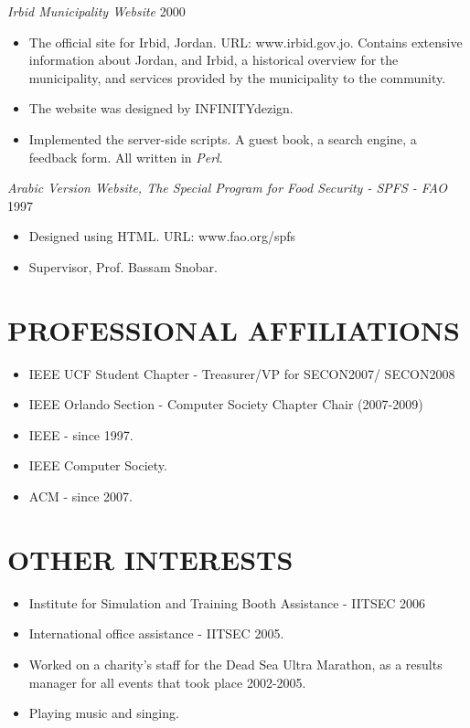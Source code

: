 \documentclass[line,margin]{res}
\begin{document}
\begin{resume}
{\sl Irbid Municipality Website} \hfill   2000 \\
\begin{itemize} \itemsep -2pt
     \item The official site for Irbid, Jordan. URL: www.irbid.gov.jo.
     Contains extensive information about Jordan, and Irbid, a historical
     overview for the municipality, and services provided by the municipality
     to the community.
     \item The website was designed by INFINITYdezign.
     \item Implemented the server-side scripts. A guest book, a search engine,
     a feedback form. All written in \textit{Perl}.
\end{itemize} 

{\sl Arabic Version Website, The Special Program for Food Security - SPFS - FAO}
\hfill   1997 \\
\begin{itemize} \itemsep -2pt
     \item Designed using HTML. URL: www.fao.org/spfs
     \item Supervisor, Prof. Bassam Snobar.
\end{itemize} 

\section{PROFESSIONAL AFFILIATIONS}
\begin{itemize} \itemsep -2pt
     \item IEEE UCF Student Chapter - Treasurer/VP for SECON2007/ SECON2008
     \item IEEE Orlando Section  - Computer Society Chapter Chair (2007-2009)
     \item IEEE - since 1997.
     \item IEEE Computer Society.
     \item ACM - since 2007.
\end{itemize} 

\section{OTHER INTERESTS}
\begin{itemize} \itemsep -2pt
     \item Institute for Simulation and Training Booth Assistance - IITSEC 2006
     \item International office assistance - IITSEC 2005.
     \item Worked on a charity's staff for the Dead Sea Ultra Marathon, as a
     results manager for all events that took place 2002-2005.
     \item Playing music and singing.
\end{itemize} 


\end{resume}
\end{document}
